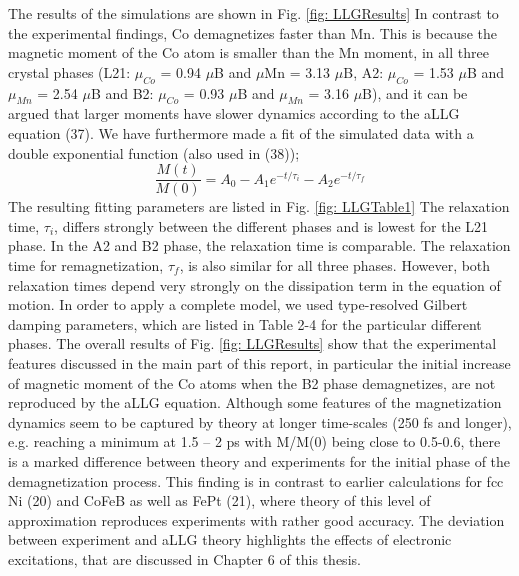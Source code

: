 The results of the simulations are shown in Fig. \ref{fig: LLGResults} In contrast to the experimental findings, Co demagnetizes faster than Mn. This is because the magnetic moment of the Co atom is smaller than the Mn moment, in all three crystal phases (L21: $\mu_{Co}$ = 0.94 $\mu$B and $\mu$Mn = 3.13 $\mu$B, A2: $\mu_{Co}$ = 1.53 $\mu$B and $\mu_{Mn}$ = 2.54 $\mu$B and B2: $\mu_{Co}$ = 0.93 $\mu$B and $\mu_{Mn}$ = 3.16 $\mu$B), and it can be argued that larger moments have slower dynamics according to the aLLG equation (37). We have furthermore made a fit of the simulated data with a double exponential function (also used in (38));
\begin{equation}
\frac{M(t)}{M(0)}=A_0-A_1e^{-t/\tau_i}-A_2e^{-t/\tau_f}
\end{equation}
The resulting fitting parameters are listed in Fig. \ref{fig: LLGTable1} The relaxation time, $\tau_i$, differs strongly between the different phases and is lowest for the L21 phase. In the A2 and B2 phase, the relaxation time is comparable. The relaxation time for remagnetization, $\tau_f$, is also similar for all three phases. However, both relaxation times depend very strongly on the dissipation term in the equation of motion. In order to apply a complete model, we used type-resolved Gilbert damping parameters, which are listed in Table 2-4 for the particular different phases. The overall results of Fig. \ref{fig: LLGResults} show that the experimental features discussed in the main part of this report, in particular the initial increase of magnetic moment of the Co atoms when the B2 phase demagnetizes, are not reproduced by the aLLG equation. Although some features of the magnetization dynamics seem to be captured by theory at longer time-scales (250 fs and longer), e.g. reaching a minimum at 1.5 – 2 ps with M/M(0) being close to 0.5-0.6, there is a marked difference between theory and experiments for the initial phase of the demagnetization process. This finding is in contrast to earlier calculations for fcc Ni (20) and CoFeB as well as FePt (21), where theory of this level of approximation reproduces experiments with rather good accuracy. The deviation between experiment and aLLG theory highlights the effects of electronic excitations, that are discussed in Chapter 6 of this thesis.  
